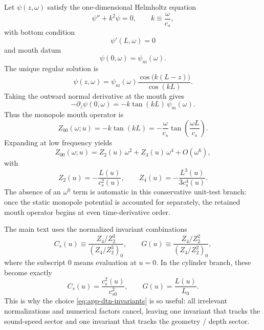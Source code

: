 \documentclass[11pt]{article}
\begin{document}
Let \(\psi(z,\omega)\) satisfy the one-dimensional Helmholtz equation
\begin{equation}
\psi''+k^2\psi=0,
\qquad
k\equiv \frac{\omega}{c_s},
\label{eq:app-dtn-helmholtz}
\end{equation}
with bottom condition
\begin{equation}
\psi'(L,\omega)=0
\label{eq:app-dtn-neumann-bottom}
\end{equation}
and mouth datum
\begin{equation}
\psi(0,\omega)=\psi_m(\omega).
\label{eq:app-dtn-mouth-datum}
\end{equation}
The unique regular solution is
\begin{equation}
\psi(z,\omega)=
\psi_m(\omega)
\frac{\cos\!\bigl(k(L-z)\bigr)}{\cos(kL)}.
\label{eq:app-dtn-cylinder-solution}
\end{equation}
Taking the outward normal derivative at the mouth gives
\begin{equation}
-\partial_z\psi(0,\omega)
=
-k\tan(kL)\,\psi_m(\omega).
\label{eq:app-dtn-mouth-derivative}
\end{equation}
Thus the monopole mouth operator is
\begin{equation}
Z_{00}(\omega;u)=-k\tan(kL)
=-\frac{\omega}{c_s}\tan\!\left(\frac{\omega L}{c_s}\right).
\label{eq:app-dtn-cylinder-exact}
\end{equation}
Expanding at low frequency yields
\begin{equation}
Z_{00}(\omega;u)=Z_2(u)\,\omega^2+Z_4(u)\,\omega^4+O(\omega^6),
\label{eq:app-dtn-Z-expansion}
\end{equation}
with
\begin{equation}
Z_2(u)=-\frac{L(u)}{c_s^2(u)},
\qquad
Z_4(u)=-\frac{L^3(u)}{3c_s^4(u)}.
\label{eq:app-dtn-Z2Z4}
\end{equation}
The absence of an \(\omega^0\) term is automatic in this conservative unit-test
branch: once the static monopole potential is accounted for separately, the retained
mouth operator begins at even time-derivative order.

The main text uses the normalized invariant combinations
\begin{equation}
C_s(u)
\equiv
\frac{Z_4/Z_2^3}{(Z_4/Z_2^3)_0},
\qquad
G(u)
\equiv
\frac{Z_4/Z_2^2}{(Z_4/Z_2^2)_0},
\label{eq:app-dtn-invariants}
\end{equation}
where the subscript \(0\) means evaluation at \(u=0\).  In the cylinder branch,
these become exactly
\begin{equation}
C_s(u)=\frac{c_s^2(u)}{c_{s0}^2},
\qquad
G(u)=\frac{L(u)}{L_0}.
\label{eq:app-dtn-cylinder-invariants}
\end{equation}
This is why the choice \cref{eq:app-dtn-invariants} is so useful: all irrelevant
normalizations and numerical factors cancel, leaving one invariant that tracks the
sound-speed sector and one invariant that tracks the geometry / depth sector.
\end{document}
